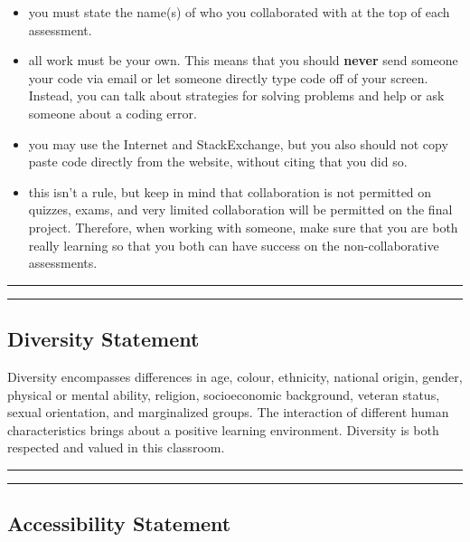 \documentclass[
]{book}
\providecommand{\tightlist}{%
  \setlength{\itemsep}{0pt}\setlength{\parskip}{0pt}}
\begin{document}
\begin{itemize}
\tightlist
\item
  you must state the name(s) of who you collaborated with at the top of each assessment.
\item
  all work must be your own. This means that you should \textbf{never} send someone your code via email or let someone directly type code off of your screen. Instead, you can talk about strategies for solving problems and help or ask someone about a coding error.
\item
  you may use the Internet and StackExchange, but you also should not copy paste code directly from the website, without citing that you did so.
\item
  this isn't a rule, but keep in mind that collaboration is not permitted on quizzes, exams, and very limited collaboration will be permitted on the final project. Therefore, when working with someone, make sure that you are both really learning so that you both can have success on the non-collaborative assessments.
\end{itemize}

\begin{center}\rule{0.5\linewidth}{0.5pt}\end{center}

\begin{center}\rule{0.5\linewidth}{0.5pt}\end{center}

\hypertarget{diversity-statement}{%
\subsection{Diversity Statement}\label{diversity-statement}}

Diversity encompasses differences in age, colour, ethnicity, national origin, gender, physical or mental ability, religion, socioeconomic background, veteran status, sexual orientation, and marginalized groups. The interaction of different human characteristics brings about a positive learning environment. Diversity is both respected and valued in this classroom.

\begin{center}\rule{0.5\linewidth}{0.5pt}\end{center}

\begin{center}\rule{0.5\linewidth}{0.5pt}\end{center}

\hypertarget{accessibility-statement}{%
\subsection{Accessibility Statement}\label{accessibility-statement}}
\end{document}
